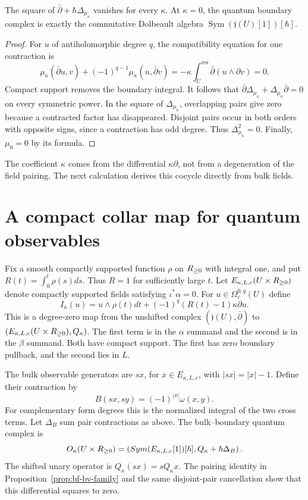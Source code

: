 \begin{lemma}
\label{lem:bf-boundary-differential}
The square of $\bar\partial+\hbar\Delta_{\mu_\kappa}$ vanishes
for every $\kappa$.  At $\kappa=0$, the quantum boundary complex is
exactly the commutative Dolbeault algebra
$\operatorname{Sym}(\mathfrak j(U)[1])[\hbar]$.
\end{lemma}
\begin{proof}
For $u$ of antiholomorphic degree $q$, the compatibility equation for
one contraction is
\[
 \mu_\kappa(\bar\partial u,v)
 +(-1)^{q-1}\mu_\kappa(u,\bar\partial v)
 =-\kappa\int_U^{\mathrm{res}}\bar\partial(u\wedge\partial v)=0.
\]
Compact support removes the boundary integral.  It follows that
$\bar\partial\Delta_{\mu_\kappa}+
\Delta_{\mu_\kappa}\bar\partial=0$ on every symmetric power.
In the square of $\Delta_{\mu_\kappa}$, overlapping pairs give zero
because a contracted factor has disappeared.  Disjoint pairs occur
in both orders with opposite signs, since a contraction has odd
degree.  Thus $\Delta_{\mu_\kappa}^2=0$.
Finally, $\mu_0=0$ by its formula.
\end{proof}

The coefficient $\kappa$ comes from the differential
$\kappa\partial$, not from a degeneration of the field pairing.
The next calculation derives this cocycle directly from bulk fields.

\section{A compact collar map for quantum observables}

Fix a smooth compactly supported function $\rho$ on $R_{\ge0}$
with integral one, and put
$R(t)=\int_0^t\rho(s)ds$.  Thus $R=1$ for sufficiently large $t$.
Let $E_{\kappa,L,c}(U\times R_{\ge0})$ denote compactly supported
fields satisfying $\iota^*\alpha=0$.
For $u\in\Omega_c^{0,q}(U)$ define
\[
 I_\kappa(u)=u\wedge\rho(t)dt
                +(-1)^q(R(t)-1)\kappa\partial u.
\]
This is a degree-zero map from the unshifted complex
$(\mathfrak j(U),\bar\partial)$ to
$(E_{\kappa,L,c}(U\times R_{\ge0}),Q_\kappa)$.
The first term is in the $\alpha$ summand and the second is in the
$\beta$ summand.  Both have compact support.  The first has zero
boundary pullback, and the second lies in $L$.

The bulk observable generators are $sx$, for $x\in E_{\kappa,L,c}$,
with $|sx|=|x|-1$.  Define their contraction by
\[
 B(sx,sy)=(-1)^{|x|}\omega(x,y).
\]
For complementary form degrees this is the normalized integral
of the two cross terms.  Let $\Delta_B$ sum pair contractions as above.
The bulk--boundary quantum complex is
\[
 O_\kappa(U\times R_{\ge0})
 =\left(Sym(E_{\kappa,L,c}[1])[\hbar],
                         Q_\kappa+\hbar\Delta_B\right).
\]
The shifted unary operator is $Q_\kappa(sx)=sQ_\kappa x$.
The pairing identity in Proposition~\ref{prop:bf-bv-family} and the
same disjoint-pair cancellation show that this differential squares
to zero.

